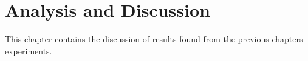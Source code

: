 \chapter{Analysis and Discussion}

This chapter contains the discussion of results found from the previous chapters experiments.




